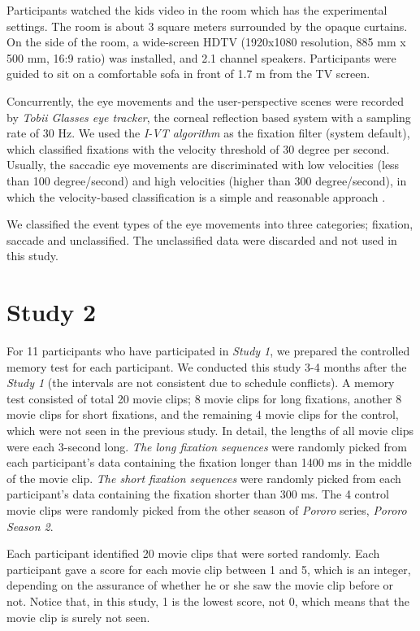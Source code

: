 \documentclass[oneside,master]{snueethesis}
\begin{document}
Participants watched the kids video in the room which has the experimental settings. The room is about 3 square meters surrounded by the opaque curtains. On the side of the room, a wide-screen HDTV (1920x1080 resolution, 885 mm x 500 mm, 16:9 ratio) was installed, and 2.1 channel speakers. Participants were guided to sit on a comfortable sofa in front of 1.7 m from the TV screen.

Concurrently, the eye movements and the user-perspective scenes were recorded by \textit{Tobii Glasses eye tracker}, the corneal reflection based system with a sampling rate of 30 Hz. We used the \textit{I-VT algorithm} as the fixation filter (system default), which classified fixations with the velocity threshold of 30 degree per second. Usually, the saccadic eye movements are discriminated with low velocities (less than 100 degree/second) and high velocities (higher than 300 degree/second), in which the velocity-based classification is a simple and reasonable approach \cite{Salvucci2000}.

We classified the event types of the eye movements into three categories; fixation, saccade and unclassified. The unclassified data were discarded and not used in this study.


\section{Study 2}

For 11 participants who have participated in \textit{Study 1}, we prepared the controlled memory test for each participant. We conducted this study 3-4 months after the \textit{Study 1} (the intervals are not consistent due to schedule conflicts). A memory test consisted of total 20 movie clips; 8 movie clips for long fixations, another 8 movie clips for short fixations, and the remaining 4 movie clips for the control, which were not seen in the previous study. In detail, the lengths of all movie clips were each 3-second long. \textit{The long fixation sequences} were randomly picked from each participant's data containing the fixation longer than 1400 ms in the middle of the movie clip. \textit{The short fixation sequences} were randomly picked from each participant's data containing the fixation shorter than 300 ms. The 4 control movie clips were randomly picked from the other season of \textit{Pororo} series, \textit{Pororo Season 2}.

Each participant identified 20 movie clips that were sorted randomly. Each participant gave a score for each movie clip between 1 and 5, which is an integer, depending on the assurance of whether he or she saw the movie clip before or not. Notice that, in this study, 1 is the lowest score, not 0, which means that the movie clip is surely not seen.
\end{document}
